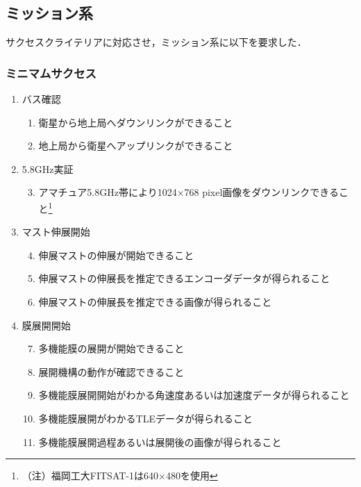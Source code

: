 \subsection{ミッション系}

サクセスクライテリアに対応させ，ミッション系に以下を要求した．

\subsubsection{ミニマムサクセス}

\begin{enumerate}
\renewcommand{\labelenumi}{(M\arabic{enumi})}
\renewcommand{\labelenumii}{(mR-\arabic{enumii})}
\item バス確認
\begin{enumerate}
\item 衛星から地上局へダウンリンクができること
\item 地上局から衛星へアップリンクができること
\end{enumerate}
\item 5.8GHz実証
\begin{enumerate}
	\setcounter{enumii}{2}
\item アマチュア5.8GHz帯により1024×768 pixel画像をダウンリンクできること\footnote{（注）福岡工大FITSAT-1は640×480を使用}
\end{enumerate}
\item マスト伸展開始
\begin{enumerate}
		\setcounter{enumii}{3}
\item 伸展マストの伸展が開始できること
\item 伸展マストの伸展長を推定できるエンコーダデータが得られること
\item 伸展マストの伸展長を推定できる画像が得られること
\end{enumerate}
\item 膜展開開始
\begin{enumerate}
		\setcounter{enumii}{6}
\item 多機能膜の展開が開始できること
\item 展開機構の動作が確認できること
\item 多機能膜展開開始がわかる角速度あるいは加速度データが得られること
\item 多機能膜展開がわかるTLEデータが得られること
\item 多機能膜展開過程あるいは展開後の画像が得られること
\end{enumerate}
\end{enumerate}

